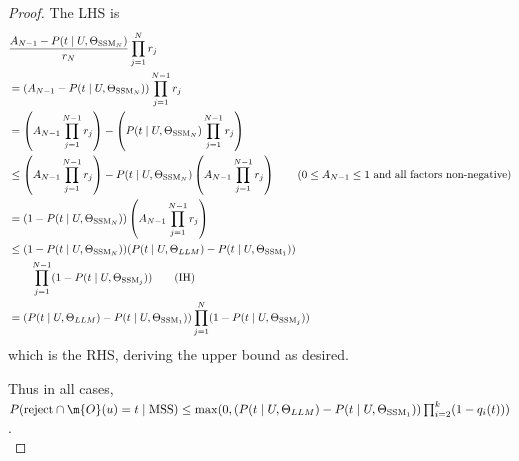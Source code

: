 \begin{proof}
The LHS is
\begin{align*}
    &\frac{A_{N-1} - P(t \mid U, \Theta_{\textrm{SSM}_N})}{r_N}\prod_{j=1}^N r_j \\
	&= (A_{N-1} - P(t \mid U, \Theta_{\textrm{SSM}_N})) \prod_{j=1}^{N-1} r_j \\
	&= \left(A_{N-1}\prod_{j=1}^{N-1} r_j \right) - \left(P(t \mid U, \Theta_{\textrm{SSM}_N})\prod_{j=1}^{N-1} r_j \right) \\
    &\leq \left(A_{N-1}\prod_{j=1}^{N-1} r_j \right) - P(t \mid U, \Theta_{\textrm{SSM}_N})\left(A_{N-1} \prod_{j=1}^{N-1} r_j \right) \tag{$0 \leq A_{N-1} \leq 1$ and all factors non-negative}\\
	&= (1-P(t \mid U, \Theta_{\textrm{SSM}_N})) \left(A_{N-1}\prod_{j=1}^{N-1} r_j \right) \\
	&\leq (1-P(t \mid U, \Theta_{\textrm{SSM}_N})) (P(t \mid U, \Theta_{LLM}) - P(t \mid U, \Theta_{\textrm{SSM}_1})) \\
    &\qquad \prod_{j=1}^{N-1} (1-P(t \mid U, \Theta_{\textrm{SSM}_j})) \tag{IH} \\
	&= (P(t \mid U, \Theta_{LLM}) - P(t \mid U, \Theta_{\textrm{SSM}_1})) \prod_{j=1}^{N} (1-P(t \mid U, \Theta_{\textrm{SSM}_j}))
\end{align*}
which is the RHS, deriving the upper bound as desired.

Thus in all cases, $P(\textrm{reject} \cap \m{O}(u)=t \mid \textrm{MSS}) \leq \max(0, (P(t \mid U, \Theta_{LLM})-P(t \mid U, \Theta_{\textrm{SSM}_1}))\prod_{i=2}^k (1-q_i(t)))$.\\


\end{proof}
